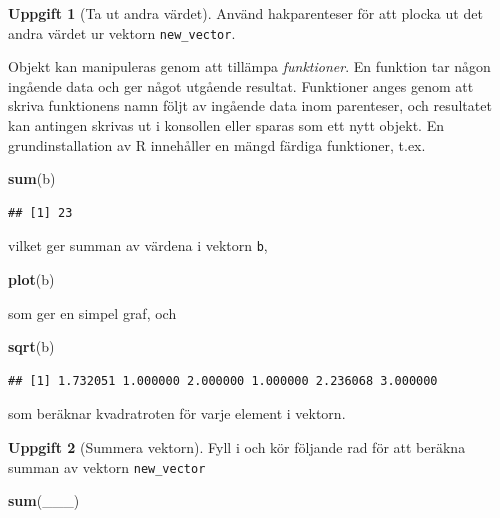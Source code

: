\documentclass[
]{book}
\newenvironment{Shaded}{\begin{snugshade}}{\end{snugshade}}
\newcommand{\FunctionTok}[1]{\textcolor[rgb]{0.13,0.29,0.53}{\textbf{#1}}}
\newcommand{\NormalTok}[1]{#1}
\theoremstyle{definition}
\theoremstyle{definition}
\theoremstyle{definition}
\newtheorem{exercise}{Uppgift}[chapter]
\theoremstyle{definition}
\theoremstyle{remark}
\begin{document}
\begin{exercise}[Ta ut andra värdet]
Använd hakparenteser för att plocka ut det andra värdet ur vektorn \texttt{new\_vector}.
\end{exercise}

Objekt kan manipuleras genom att tillämpa \emph{funktioner}. En funktion tar någon ingående data och ger något utgående resultat. Funktioner anges genom att skriva funktionens namn följt av ingående data inom parenteser, och resultatet kan antingen skrivas ut i konsollen eller sparas som ett nytt objekt. En grundinstallation av R innehåller en mängd färdiga funktioner, t.ex.

\begin{Shaded}
\begin{Highlighting}[]
\FunctionTok{sum}\NormalTok{(b)}
\end{Highlighting}
\end{Shaded}

\begin{verbatim}
## [1] 23
\end{verbatim}

vilket ger summan av värdena i vektorn \texttt{b},

\begin{Shaded}
\begin{Highlighting}[]
\FunctionTok{plot}\NormalTok{(b)}
\end{Highlighting}
\end{Shaded}

som ger en simpel graf, och

\begin{Shaded}
\begin{Highlighting}[]
\FunctionTok{sqrt}\NormalTok{(b)}
\end{Highlighting}
\end{Shaded}

\begin{verbatim}
## [1] 1.732051 1.000000 2.000000 1.000000 2.236068 3.000000
\end{verbatim}

som beräknar kvadratroten för varje element i vektorn.

\begin{exercise}[Summera vektorn]

Fyll i och kör följande rad för att beräkna summan av vektorn \texttt{new\_vector}

\begin{Shaded}
\begin{Highlighting}[]
\FunctionTok{sum}\NormalTok{(\_\_\_)}
\end{Highlighting}
\end{Shaded}

\end{exercise}
\end{document}
